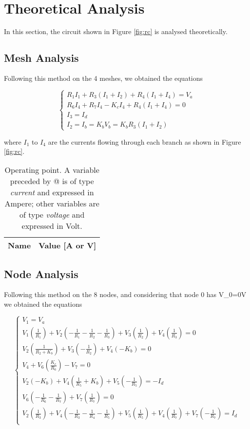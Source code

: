\section{Theoretical Analysis}
\label{sec:analysis}

In this section, the circuit shown in Figure \ref{fig:rc} is analysed
theoretically.

\subsection{Mesh Analysis}
Following this method on the 4 meshes, we obtained the equations

\begin{equation}
\begin{cases}
R_1 I_1 + R_3 (I_1+I_2)+R_4(I_1+I_4)=V_a\\
R_6 I_4 + R_7 I_4 -K_c I_4 + R_4 (I_1+I_4)=0\\
I_3=I_d\\
I_2=I_b=K_b V_b = K_b R_3 (I_1+I_2)
\end{cases}
\end{equation}

where $I_1$ to $I_4$ are the currents flowing through each branch as shown in Figure \ref{fig:rc}.

\begin{table}[h]
  \centering
  \begin{tabular}{|l|r|}
    \hline    
    {\bf Name} & {\bf Value [A or V]} \\ \hline
    
 \end{tabular}
 \caption{Operating point. A variable preceded by @ is of type {\em current}
   and expressed in Ampere; other variables are of type {\it voltage} and expressed in
   Volt.}
  \label{tab:op}
\end{table}

\subsection{Node Analysis}
Following this method on the 8 nodes, and considering that node 0 has V_{0}=0V we obtained the equations

\begin{equation}
\begin{cases}
V_1=V_a\\
V_1(\frac{1}{R_1})+V_2(-\frac{1}{R_1}-\frac{1}{R_2}-\frac{1}{R_3})+V_3(\frac{1}{R_2})+V_4(\frac{1}{R_3})=0\\
V_2(\frac{1}{R_2+K_b})+V_3(-\frac{1}{R_2})+V_4(-K_b)=0\\
V_4+V_6(\frac{K_c}{R_6})-V_7= 0\\
V_2(-K_b)+V_4(\frac{1}{R_5}+K_b)+V_5(-\frac{1}{R_5})= -I_d\\
V_6(-\frac{1}{R_6}-\frac{1}{R_7})+V_7(\frac{1}{R_7})= 0\\
V_2(\frac{1}{R_3})+V_4(-\frac{1}{R_3}-\frac{1}{R_4}-\frac{1}{R_5})+V_5(\frac{1}{R_5})+V_4(\frac{1}{R_7})+V_7(-\frac{1}{R_7})=I_d\\
\end{cases}
\end{equation}

